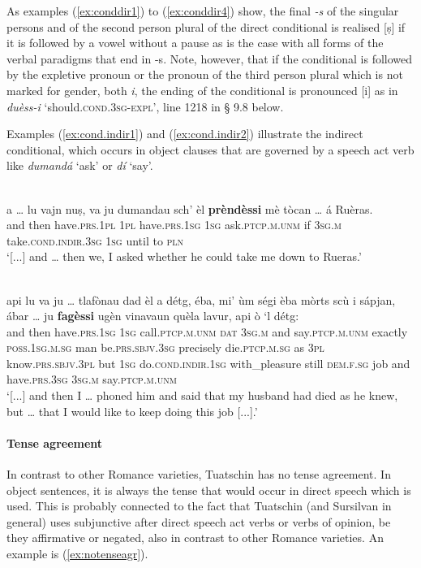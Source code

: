 As examples (\ref{ex:conddir1}) to (\ref{ex:conddir4}) show, the final \textit{-s} of the singular persons and of the second person plural of the direct conditional is realised [ṣ] if it is followed by a vowel without a pause as is the case with all forms of the verbal paradigms that end in -s. Note, however, that if the conditional is followed by the expletive pronoun or the pronoun of the third person plural which is not marked for gender, both \textit{i}, the ending of the conditional is pronounced [i] as in \textit{duèss-i} `should.\textsc{cond.3sg}-\textsc{expl}', line 1218 in § 9.8 below.


Examples (\ref{ex:cond.indir1}) and (\ref{ex:cond.indir2}) illustrate the indirect conditional, which occurs in object clauses that are governed by a speech act verb like \textit{dumandá} `ask' or \textit{dí} `say'.

\ea
\label{ex:cond.indir1}
\\
\gll  [...]  a … lu vajn nuṣ, va ju dumandau sch’ èl \textbf{prèndèssi} mè tòcan … á Ruèras. \\
{} and {} then have.\textsc{prs.1pl} \textsc{1pl} have.\textsc{prs.1sg}  \textsc{1sg} ask.\textsc{ptcp.m.unm} if \textsc{3sg.m} take.\textsc{cond.indir.3sg} \textsc{1sg} until {} to \textsc{pln}\\
\glt `[...] and … then we, I asked whether he could take me down to Rueras.'
\z

\ea
\label{ex:cond.indir2}
\\
\gll  [...] api lu va ju … tlafònau dad èl a détg, éba, mi' ùm ségi èba mòrts scù i sápjan, ábar … ju \textbf{fagèssi} ugèn vinavaun quèla lavur, api ò `l détg:  \\
{} and then have.\textsc{prs.1sg} \textsc{1sg} {} call.\textsc{ptcp.m.unm} \textsc{dat} \textsc{3sg.m} and say.\textsc{ptcp.m.unm} exactly \textsc{poss.1sg.m.sg} man be.\textsc{prs.sbjv.3sg} precisely die.\textsc{ptcp.m.sg} as \textsc{3pl} know.\textsc{prs.sbjv.3pl} but {} \textsc{1sg} do.\textsc{cond.indir.1sg} with\_pleasure still \textsc{dem.f.sg} job and have.\textsc{prs.3sg} \textsc{3sg.m} say.\textsc{ptcp.m.unm}\\ 
\glt `[...] and then I … phoned him and said that my husband had died as he knew, but … that I would like to keep doing this job [...].'
\z

\paragraph{Tense agreement}
In contrast to other Romance varieties, Tuatschin has no tense agreement. In object sentences, it is always the tense that would occur in direct speech which is used. This is probably connected to the fact that Tuatschin (and Sursilvan in general) uses subjunctive after direct speech act verbs or verbs of opinion, be they affirmative or negated, also in contrast to other Romance varieties. An example is (\ref{ex:notenseagr}).

